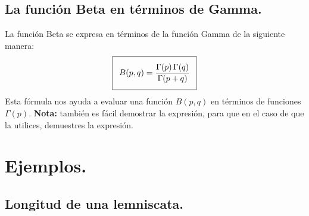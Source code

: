 \subsection{La función Beta en términos de Gamma.}

La función Beta se expresa en términos de la función Gamma de la siguiente manera:
\begin{align}
\addtolength{\fboxsep}{5pt}\boxed{B(p, q) = \dfrac{\Gamma(p) \, \Gamma(q)}{\Gamma (p + q)}}
\label{eq:ecuacion_07_01}
\end{align}
Esta fórmula nos ayuda a evaluar una función $B (p, q)$ en términos de funciones $\Gamma (p)$. \textbf{Nota: } también es fácil demostrar la expresión, para que en el caso de que la utilices, demuestres la expresión.

\section{Ejemplos.}

\subsection{Longitud de una lemniscata.}

